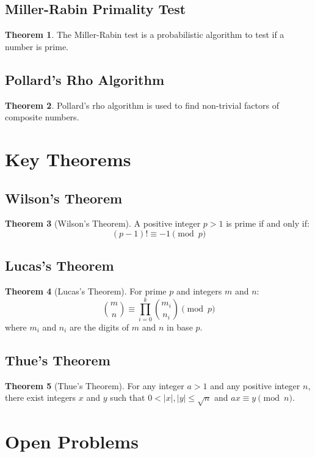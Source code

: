 \documentclass[11pt]{article}
\theoremstyle{definition}
\newtheorem{theorem}{Theorem}[section]
\begin{document}
\subsection{Miller-Rabin Primality Test}
\begin{theorem}
The Miller-Rabin test is a probabilistic algorithm to test if a number is prime.
\end{theorem}

\subsection{Pollard's Rho Algorithm}
\begin{theorem}
Pollard's rho algorithm is used to find non-trivial factors of composite numbers.
\end{theorem}

\section{Key Theorems}

\subsection{Wilson's Theorem}
\begin{theorem}[Wilson's Theorem]
A positive integer $p > 1$ is prime if and only if:
$$(p-1)! \equiv -1 \pmod{p}$$
\end{theorem}

\subsection{Lucas's Theorem}
\begin{theorem}[Lucas's Theorem]
For prime $p$ and integers $m$ and $n$:
$$\binom{m}{n} \equiv \prod_{i=0}^k \binom{m_i}{n_i} \pmod{p}$$
where $m_i$ and $n_i$ are the digits of $m$ and $n$ in base $p$.
\end{theorem}

\subsection{Thue's Theorem}
\begin{theorem}[Thue's Theorem]
For any integer $a > 1$ and any positive integer $n$, there exist integers $x$ and $y$ such that $0 < |x|, |y| \leq \sqrt{n}$ and $ax \equiv y \pmod{n}$.
\end{theorem}

\section{Open Problems}
\end{document}
